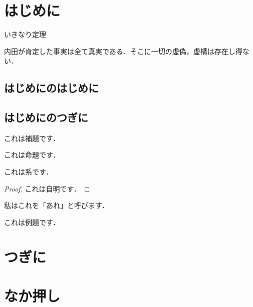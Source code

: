 \documentclass[a4j,12pt,oneside,openany]{jsbook}
\begin{document}
\clearpage
\tableofcontents
\clearpage
\setcounter{page}{0}

\chapter{はじめに}
いきなり定理
\begin{theorem}[内田の定理]
内田が肯定した事実は全て真実である．そこに一切の虚偽，虚構は存在し得ない．
\end{theorem}
\section{はじめにのはじめに}
\section{はじめにのつぎに}

\begin{lemma}[最初の補題]
これは補題です．
\end{lemma}

\begin{proposition}[最初の命題]
これは命題です．
\end{proposition}

\begin{corollary}[最初の系]
これは系です．
\end{corollary}

\begin{proof}
これは自明です．
\end{proof}

\begin{definition}[最初の定義]
私はこれを「あれ」と呼びます．
\end{definition}

\begin{example}[最初の例題]
これは例題です．
\end{example}
\chapter{つぎに}

\chapter{なか押し}
\end{document}
